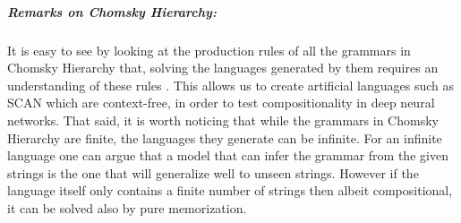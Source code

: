 \subparagraph{Remarks on Chomsky Hierarchy:}It is easy to see by looking at the production rules of all the grammars in Chomsky Hierarchy that, solving the languages generated by them requires an understanding of these rules . This allows us to create artificial languages such as SCAN \citep{Lake2017} which are context-free, in order to test compositionality in deep neural networks. That said, it is worth noticing that while the grammars in Chomsky Hierarchy are finite, the languages they generate can be infinite. For an infinite language one can argue that a model that can infer the grammar from the given strings is the one that will generalize well to unseen strings. However if the language itself only contains a finite number of strings then albeit compositional, it can be solved also by pure memorization.
